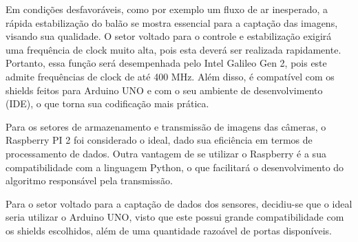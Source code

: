     Em condições desfavoráveis, como por exemplo um fluxo de ar inesperado, a rápida estabilização do balão se mostra essencial para a captação das imagens, visando sua qualidade. O setor voltado para o controle e estabilização exigirá uma frequência de clock muito alta, pois esta deverá ser realizada rapidamente. Portanto, essa função será desempenhada pelo Intel Galileo Gen 2, pois este admite frequências de clock de até 400 MHz. Além disso, é compatível com os shields feitos para Arduino UNO e com o seu ambiente de desenvolvimento (IDE), o que torna sua codificação mais prática.
    
    Para os setores de armazenamento e transmissão de imagens das câmeras, o Raspberry PI 2 foi considerado o ideal, dado sua eficiência em termos de processamento de dados. Outra vantagem de se utilizar o Raspberry é a sua compatibilidade com a linguagem Python, o que facilitará o desenvolvimento do algoritmo responsável pela transmissão.
    
    Para o setor voltado para a captação de dados dos sensores, decidiu-se que o ideal seria utilizar o Arduino UNO, visto que este possui grande compatibilidade com os shields escolhidos, além de uma quantidade razoável de portas disponíveis.

  
  
